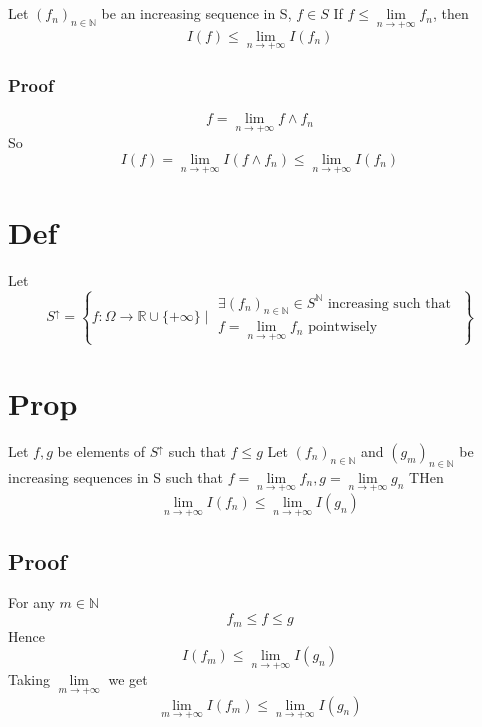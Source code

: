 \documentclass{book}
\begin{document}
\subsection{}
Let $(f_n)_{n\in \mathbb{N}}$ be  an increasing sequence in S, $f\in S$
If $f\leq\lim\limits_{n\rightarrow+\infty}f_n$, then $$I(f)\leq\lim\limits_{n\rightarrow+\infty}I(f_n)$$
\subsubsection*{Proof}
$$f=\lim\limits_{n\rightarrow+\infty}f\wedge f_n$$
So $$I(f)=\lim\limits_{n\rightarrow+\infty}I(f\wedge f_n)\leq\lim\limits_{n\rightarrow+\infty}I(f_n)$$
\section{Def}
Let $$S^\uparrow =\left\{f:\Omega\rightarrow\mathbb{R}\cup\{+\infty\}\mid
\begin{aligned}
    \exists (f_n)_{n\in\mathbb{N}}\in S^\mathbb{N}\text{ increasing such that }\\f=\lim\limits_{n\rightarrow+\infty}f_n \text{ pointwisely}
\end{aligned}\right\}
$$
\section{Prop}
Let $f,g$ be elements of $S^\uparrow$ such that $f\leq g$ Let $(f_n)_{n\in\mathbb{N}}$ and $(g_m)_{n\in\mathbb{N}}$ be increasing sequences in S such that $f=\lim\limits_{n\rightarrow+\infty}f_n,g=\lim\limits_{n\rightarrow+\infty}g_n$ THen $$\lim\limits_{n\rightarrow+\infty}I(f_n)\leq\lim\limits_{n\rightarrow+\infty}I(g_n)$$
\subsection*{Proof}
For any $m\in \mathbb{N}$$$f_m\leq f\leq g$$ 
Hence $$I(f_m)\leq\lim\limits_{n\rightarrow+\infty}I(g_n)$$
Taking $\lim\limits_{m\rightarrow+\infty}$ we get 
$$\lim\limits_{m\rightarrow+\infty}I(f_m)\leq\lim\limits_{n\rightarrow+\infty}I(g_n)$$
\end{document}
